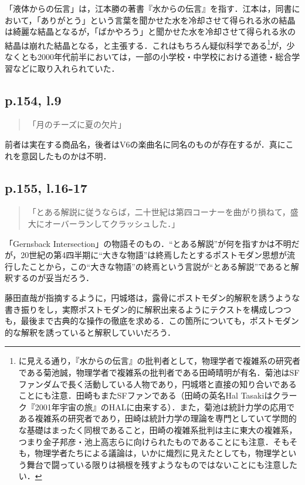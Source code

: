 \documentclass[10pt, a5paper, twoside]{ltjsarticle}
\begin{document}
            「液体からの伝言」は，江本勝の著書『水からの伝言』\cite{emoto}を指す．江本は，同書において，「ありがとう」という言葉を聞かせた水を冷却させて得られる氷の結晶は綺麗な結晶となるが，「ばかやろう」と聞かせた水を冷却させて得られる氷の結晶は崩れた結晶となる，と主張する．これはもちろん疑似科学である\footnote{\cite{amabane}に見える通り，『水からの伝言』の批判者として，物理学者で複雑系の研究者である菊池誠，物理学者で複雑系の批判者である田崎晴明が有名．菊池はSFファンダムで長く活動している人物であり，円城塔と直接の知り合いであることにも注意．田崎もまたSFファンである（田崎の英名Hal Tasakiはクラーク『2001年宇宙の旅』のHALに由来する）．また，菊池は統計力学の応用である複雑系の研究者であり，田崎は統計力学の理論を専門としていて学問的な基礎はまったく同根であること，田崎の複雑系批判は主に東大の複雑系，つまり金子邦彦・池上高志らに向けられたものであることにも注意．そもそも，物理学者たちによる議論は，いかに熾烈に見えたとしても，物理学という舞台で闘っている限りは禍根を残すようなものではないことにも注意したい．}が，少なくとも2000年代前半においては，一部の小学校・中学校における道徳・総合学習などに取り入れられていた\cite{amabane}．

        \subsection{p.154, l.9}

            \begin{quote}
                「月のチーズに夏の欠片」
            \end{quote}

            前者は実在する商品名，後者はV6の楽曲名に同名のものが存在するが．真にこれを意図したものかは不明．

        \subsection{p.155, l.16-17}

            \begin{quote}
                「とある解説に従うならば，二十世紀は第四コーナーを曲がり損ねて，盛大にオーバーランしてクラッシュした．」
            \end{quote}

            「Gernsback Intersection」の物語そのもの．“とある解説”が何を指すかは不明だが，20世紀の第4四半期に“大きな物語”は終焉したとするポストモダン思想が流行したことから，この“大きな物語”の終焉という言説が“とある解説”であると解釈するのが妥当だろう．

            藤田直哉\cite{fujita}が指摘するように，円城塔は，露骨にポストモダン的解釈を誘うような書き振りをし，実際ポストモダン的に解釈出来るようにテクストを構成しつつも，最後まで古典的な操作の徹底を求める．この箇所についても，ポストモダン的な解釈を誘っていると解釈していいだろう．
\end{document}
